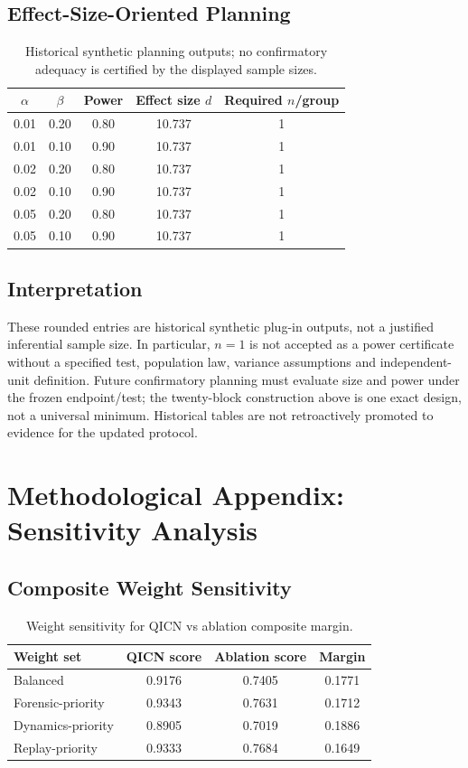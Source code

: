 \documentclass[11pt,a4paper]{article}
\theoremstyle{definition}
\begin{document}
\subsection{Effect-Size-Oriented Planning}
\begin{table}[!htbp]
\centering
\begin{tabular}{ccccc}
\toprule
$\alpha$ & $\beta$ & Power & Effect size $d$ & Required $n$/group \\
\midrule
0.01 & 0.20 & 0.80 & 10.737 & 1 \\
0.01 & 0.10 & 0.90 & 10.737 & 1 \\
0.02 & 0.20 & 0.80 & 10.737 & 1 \\
0.02 & 0.10 & 0.90 & 10.737 & 1 \\
0.05 & 0.20 & 0.80 & 10.737 & 1 \\
0.05 & 0.10 & 0.90 & 10.737 & 1 \\
\bottomrule
\end{tabular}
\caption{Historical synthetic planning outputs; no confirmatory adequacy is certified by the displayed sample sizes.}
\end{table}

\subsection{Interpretation}
These rounded entries are historical synthetic plug-in outputs, not a justified inferential sample size. In particular, $n=1$ is not accepted as a power certificate without a specified test, population law, variance assumptions and independent-unit definition. Future confirmatory planning must evaluate size and power under the frozen endpoint/test; the twenty-block construction above is one exact design, not a universal minimum. Historical tables are not retroactively promoted to evidence for the updated protocol.

\section{Methodological Appendix: Sensitivity Analysis}
\subsection{Composite Weight Sensitivity}
\begin{table}[!htbp]
\centering
\begin{tabular}{lccc}
\toprule
Weight set & QICN score & Ablation score & Margin \\
\midrule
Balanced & 0.9176 & 0.7405 & 0.1771 \\
Forensic-priority & 0.9343 & 0.7631 & 0.1712 \\
Dynamics-priority & 0.8905 & 0.7019 & 0.1886 \\
Replay-priority & 0.9333 & 0.7684 & 0.1649 \\
\bottomrule
\end{tabular}
\caption{Weight sensitivity for QICN vs ablation composite margin.}
\end{table}
\end{document}
